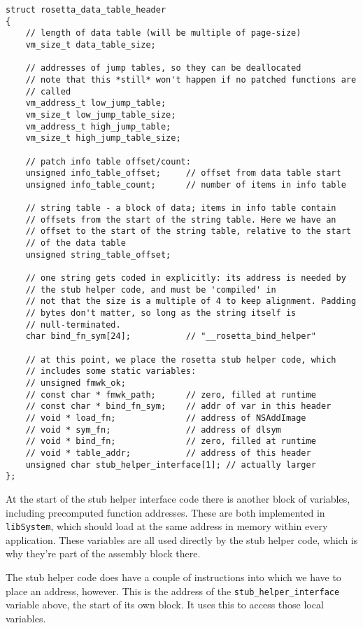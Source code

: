 \documentclass[english]{article}
\begin{document}
\begin{lstlisting}[label= dataTableHeader, caption=Rosetta data table header structure.]
struct rosetta_data_table_header
{
    // length of data table (will be multiple of page-size)
    vm_size_t data_table_size;

    // addresses of jump tables, so they can be deallocated
    // note that this *still* won't happen if no patched functions are
    // called
    vm_address_t low_jump_table;
    vm_size_t low_jump_table_size;
    vm_address_t high_jump_table;
    vm_size_t high_jump_table_size;

    // patch info table offset/count:
    unsigned info_table_offset;     // offset from data table start
    unsigned info_table_count;      // number of items in info table

    // string table - a block of data; items in info table contain
    // offsets from the start of the string table. Here we have an
    // offset to the start of the string table, relative to the start
    // of the data table
    unsigned string_table_offset;

    // one string gets coded in explicitly: its address is needed by
    // the stub helper code, and must be 'compiled' in
    // not that the size is a multiple of 4 to keep alignment. Padding
    // bytes don't matter, so long as the string itself is
    // null-terminated.
    char bind_fn_sym[24];           // "__rosetta_bind_helper"

    // at this point, we place the rosetta stub helper code, which
    // includes some static variables:
    // unsigned fmwk_ok;
    // const char * fmwk_path;      // zero, filled at runtime
    // const char * bind_fn_sym;    // addr of var in this header
    // void * load_fn;              // address of NSAddImage
    // void * sym_fn;               // address of dlsym
    // void * bind_fn;              // zero, filled at runtime
    // void * table_addr;           // address of this header
    unsigned char stub_helper_interface[1]; // actually larger
};
\end{lstlisting}

At the start of the stub helper interface code there is another block of variables, including precomputed function addresses. These are both implemented in \texttt{libSystem}, which should load at the same address in memory within every application. These variables are all used directly by the stub helper code, which is why they're part of the assembly block there.

The stub helper code does have a couple of instructions into which we have to place an address, however. This is the address of the \texttt{stub\_helper\_interface} variable above, the start of its own block. It uses this to access those local variables.
\end{document}
